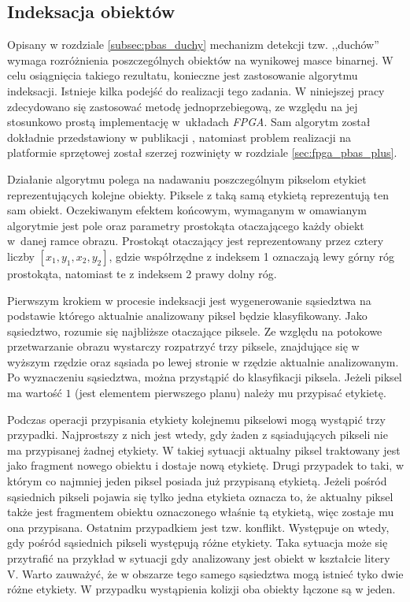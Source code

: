 

\subsection{Indeksacja obiektów}
\label{subsec:pbas_indeksacja}

Opisany w rozdziale \ref{subsec:pbas_duchy} mechanizm detekcji tzw. ,,duchów'' wymaga rozróżnienia poszczególnych obiektów na wynikowej masce binarnej. 
W celu osiągnięcia takiego rezultatu, konieczne jest zastosowanie algorytmu indeksacji. 
Istnieje kilka podejść do realizacji tego zadania. 
W niniejszej pracy zdecydowano się zastosować metodę jednoprzebiegową, ze względu na jej stosunkowo prostą implementację w~układach \textit{FPGA}. Sam algorytm został dokładnie przedstawiony w publikacji \cite{kryjak_14_pbas}, natomiast problem realizacji na platformie sprzętowej został szerzej rozwinięty w rozdziale \ref{sec:fpga_pbas_plus}. %

Działanie algorytmu polega na nadawaniu poszczególnym pikselom etykiet reprezentujących kolejne obiekty. 
Piksele z taką samą etykietą reprezentują ten sam obiekt. 
Oczekiwanym efektem końcowym, wymaganym w omawianym algorytmie jest pole oraz parametry prostokąta otaczającego każdy obiekt w~danej ramce obrazu.
Prostokąt otaczający jest reprezentowany przez cztery liczby $[x_1,y_1,x_2,y_2]$, gdzie współrzędne z indeksem 1 oznaczają lewy górny róg prostokąta, natomiast te z indeksem 2 prawy dolny róg. 

Pierwszym krokiem w procesie indeksacji jest wygenerowanie sąsiedztwa na podstawie którego aktualnie analizowany piksel będzie klasyfikowany. 
Jako sąsiedztwo, rozumie się najbliższe otaczające piksele. 
Ze względu na potokowe przetwarzanie obrazu wystarczy rozpatrzyć trzy piksele, znajdujące się w wyższym rzędzie oraz sąsiada po lewej stronie w rzędzie aktualnie analizowanym. 
Po wyznaczeniu sąsiedztwa, można przystąpić do klasyfikacji piksela. 
Jeżeli piksel ma wartość $1$ (jest elementem pierwszego planu) należy mu przypisać etykietę.  

Podczas operacji przypisania etykiety kolejnemu pikselowi mogą wystąpić trzy przypadki. 
Najprostszy z nich jest wtedy, gdy żaden z sąsiadujących pikseli nie ma przypisanej żadnej etykiety. 
W takiej sytuacji aktualny piksel traktowany jest jako fragment nowego obiektu i dostaje nową etykietę. 
Drugi przypadek to taki, w którym co najmniej jeden piksel posiada już przypisaną etykietą. 
Jeżeli pośród sąsiednich pikseli pojawia się tylko jedna etykieta oznacza to, że aktualny piksel także jest fragmentem obiektu oznaczonego właśnie tą etykietą, więc zostaje mu ona przypisana.
Ostatnim przypadkiem jest tzw. konflikt. 
Występuje on wtedy, gdy pośród sąsiednich pikseli występują różne etykiety. 
Taka sytuacja może się przytrafić na przykład w sytuacji gdy analizowany jest obiekt w kształcie litery V. 
Warto zauważyć, że w obszarze tego samego sąsiedztwa mogą istnieć tyko dwie różne etykiety. 
W przypadku wystąpienia kolizji oba obiekty łączone są w jeden.

